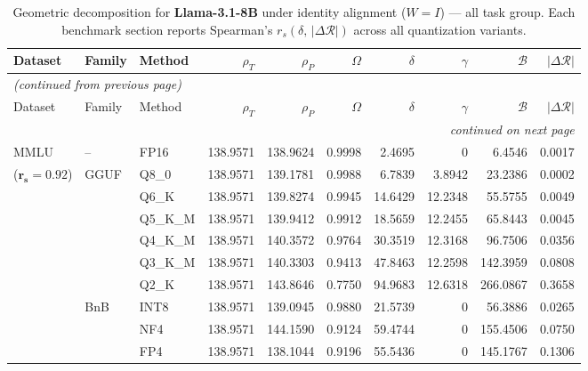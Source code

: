 \begingroup
\small
\setlength{\tabcolsep}{4pt}
\renewcommand{\arraystretch}{1.05}
\setlength{\LTcapwidth}{\textwidth}
\begin{longtable}{ll l rrrrrrr}
\caption{Geometric decomposition for \textbf{Llama-3.1-8B} under identity alignment ($W{=}I$) --- all task group. Each benchmark section reports Spearman's $r_s(\delta,\,|\Delta\mathcal{R}|)$ across all quantization variants.}\label{tab:llama_decomposition_all}\\
\toprule
Dataset & Family & Method & $\rho_T$ & $\rho_P$ & $\Omega$ & $\delta$ & $\gamma$ & $\mathcal{B}$ & $|\Delta\mathcal{R}|$ \\
\midrule
\endfirsthead
\multicolumn{10}{l}{\small\itshape (continued from previous page)}\\
\toprule
Dataset & Family & Method & $\rho_T$ & $\rho_P$ & $\Omega$ & $\delta$ & $\gamma$ & $\mathcal{B}$ & $|\Delta\mathcal{R}|$ \\
\midrule
\endhead
\midrule
\multicolumn{10}{r}{\small\itshape continued on next page}\\
\endfoot
\bottomrule
\endlastfoot
MMLU & -- & FP16 & 138.9571 & 138.9624 & 0.9998 & 2.4695 & \cellcolor{cyan!12} $0$ & 6.4546 & 0.0017 \\
{\small ($\mathbf{r_s{=}0.92}$)} & GGUF & Q8\_0 & 138.9571 & 139.1781 & 0.9988 & 6.7839 & 3.8942 & 23.2386 & 0.0002 \\
 &  & Q6\_K & 138.9571 & 139.8274 & 0.9945 & 14.6429 & 12.2348 & 55.5755 & 0.0049 \\
 &  & Q5\_K\_M & 138.9571 & 139.9412 & 0.9912 & 18.5659 & 12.2455 & 65.8443 & 0.0045 \\
 &  & Q4\_K\_M & 138.9571 & 140.3572 & 0.9764 & 30.3519 & 12.3168 & 96.7506 & 0.0356 \\
 &  & Q3\_K\_M & 138.9571 & 140.3303 & \cellcolor{red!18} 0.9413 & \cellcolor{red!18} 47.8463 & 12.2598 & \cellcolor{red!18} 142.3959 & \cellcolor{red!18} 0.0808 \\
 &  & Q2\_K & 138.9571 & 143.8646 & \cellcolor{red!35} 0.7750 & \cellcolor{red!35} 94.9683 & 12.6318 & \cellcolor{red!35} 266.0867 & \cellcolor{red!35} 0.3658 \\
 & BnB & INT8 & 138.9571 & 139.0945 & 0.9880 & 21.5739 & \cellcolor{cyan!12} $0$ & 56.3886 & 0.0265 \\
 &  & NF4 & 138.9571 & 144.1590 & \cellcolor{red!18} 0.9124 & \cellcolor{red!18} 59.4744 & \cellcolor{cyan!12} $0$ & \cellcolor{red!18} 155.4506 & \cellcolor{red!18} 0.0750 \\
 &  & FP4 & 138.9571 & 138.1044 & \cellcolor{red!18} 0.9196 & \cellcolor{red!18} 55.5436 & \cellcolor{cyan!12} $0$ & \cellcolor{red!18} 145.1767 & \cellcolor{red!18} 0.1306 \\

\end{longtable}
